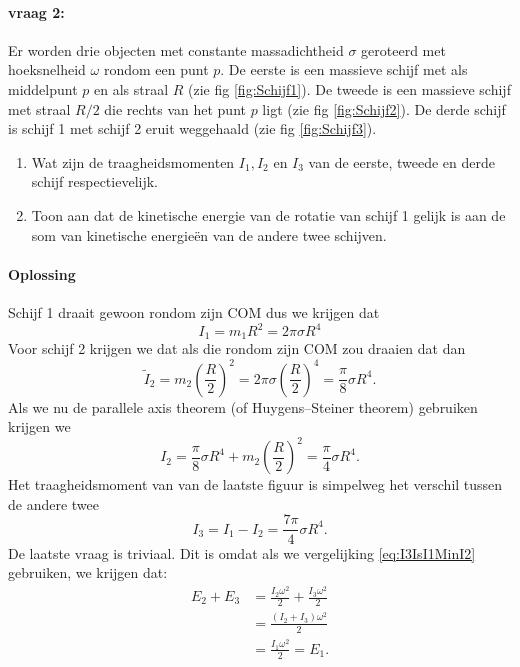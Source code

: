 \documentclass[11pt]{article}
\begin{document}
\paragraph{vraag 2:}
Er worden drie objecten met constante massadichtheid $\sigma$ geroteerd met hoeksnelheid $\omega$ rondom een punt $p$. De eerste is een massieve schijf met als middelpunt $p$ en als straal $R$ (zie fig \ref{fig:Schijf1}). De tweede is een massieve schijf met straal $R/2$ die rechts van het punt $p$ ligt (zie fig \ref{fig:Schijf2}). De derde schijf is schijf 1 met schijf 2 eruit weggehaald (zie fig \ref{fig:Schijf3}).
\begin{enumerate}
	\item Wat zijn de traagheidsmomenten $I_1,I_2$ en $I_3$ van de eerste, tweede en derde schijf respectievelijk.
	\item Toon aan dat de kinetische energie van de rotatie van schijf 1 gelijk is aan de som van kinetische energie\"en van de andere twee schijven.
\end{enumerate}
\paragraph{Oplossing}Schijf 1 draait gewoon rondom zijn COM dus we krijgen dat
\begin{equation}
	I_1=m_1R^2=2\pi \sigma R^4
\end{equation}
Voor schijf 2 krijgen we dat als die rondom zijn COM zou draaien dat dan
\begin{equation}
	\tilde I_2=m_2\left(\frac{R}{2}\right)^2=2\pi \sigma \left(\frac{R}{2}\right)^4=\frac{\pi}{8}\sigma R^4.
\end{equation}
Als we nu de parallele axis theorem (of Huygens–Steiner theorem) gebruiken krijgen we
\begin{equation}
	I_2=\frac{\pi}{8}\sigma R^4+m_2 \left(\frac{R}{2}\right)^2=\frac{\pi}{4}\sigma R^4.
\end{equation}
Het traagheidsmoment van van de laatste figuur is simpelweg het verschil tussen de andere twee
\begin{equation}\label{eq:I3IsI1MinI2}
	I_3=I_1-I_2=\frac{7\pi}{4}\sigma R^4.
\end{equation}
De laatste vraag is triviaal. Dit is omdat als we vergelijking \eqref{eq:I3IsI1MinI2} gebruiken, we krijgen dat:
\begin{align}
	E_2+E_3&=\frac{I_2\omega^2}{2}+\frac{I_3\omega^2}{2}\\
	&=\frac{(I_2+I_3)\omega^2}{2}\\
	&=\frac{I_1\omega^2}{2}=E_1.
\end{align}
\end{document}
